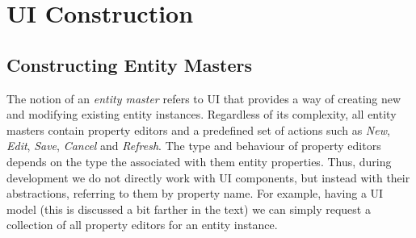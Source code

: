 \chapter{UI Construction}\label{ch01:03}








\section{Constructing Entity Masters}

  The notion of an \emph{entity master} refers to UI that provides a way of creating new and modifying existing entity instances.
  Regardless of its complexity, all entity masters contain property editors and a predefined set of actions such as \emph{New}, \emph{Edit}, \emph{Save}, \emph{Cancel} and \emph{Refresh}.
  The type and behaviour of property editors depends on the type the associated with them entity properties.
  Thus, during development we do not directly work with UI components, but instead with their abstractions, referring to them by property name.
  For example, having a UI model (this is discussed a bit farther in the text) we can simply request a collection of all property editors for an entity instance.
  
